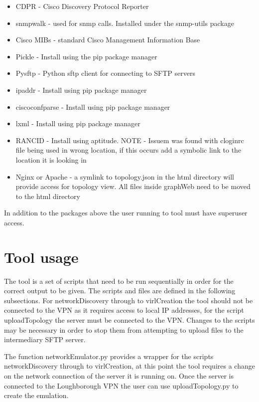 \documentclass[11pt]{report}
\begin{document}
\begin{appendices}
\begin{itemize}
	\item{CDPR - Cisco Discovery Protocol Reporter}
	\item{snmpwalk - used for snmp calls. Installed under the snmp-utils package}
	\item{Cisco MIBs - standard Cisco Management Information Base}
	\item{Pickle - Install using the pip package manager}
	\item{Pysftp - Python sftp client for connecting to SFTP servers}
	\item{ipaddr - Install using pip package manager}
	\item{ciscoconfparse - Install using pip package manager}
	\item{lxml - Install using pip package manager}
	\item{RANCID - Install using aptitude. NOTE - Issuem was found with cloginrc file being used in wrong location, if this occurs add a symbolic link to the location it is looking in}
	\item{Nginx or Apache - a symlink to topology.json in the html directory will provide access for topology view. All files inside graphWeb need to be moved to the html directory}
\end{itemize}

In addition to the packages above the user running to tool must have superuser access.

\section{Tool usage}

The tool is a set of scripts that need to be run sequentially in order for the correct output to be given. The scripts and files are defined in the following subsections. For networkDiscovery through to virlCreation the tool should not be connected to the VPN as it requires access to local IP addresses, for the script uploadTopology the server must be connected to the VPN. Changes to the scripts may be necessary in order to stop them from attempting to upload files to the intermediary SFTP server.

The function networkEmulator.py provides a wrapper for the scripts networkDiscovery through to virlCreation, at this point the tool requires a change on the network connection of the server it is running on. Once the server is connected to the Loughborough VPN the user can use uploadTopology.py to create the emulation.


\end{appendices}
\end{document}
